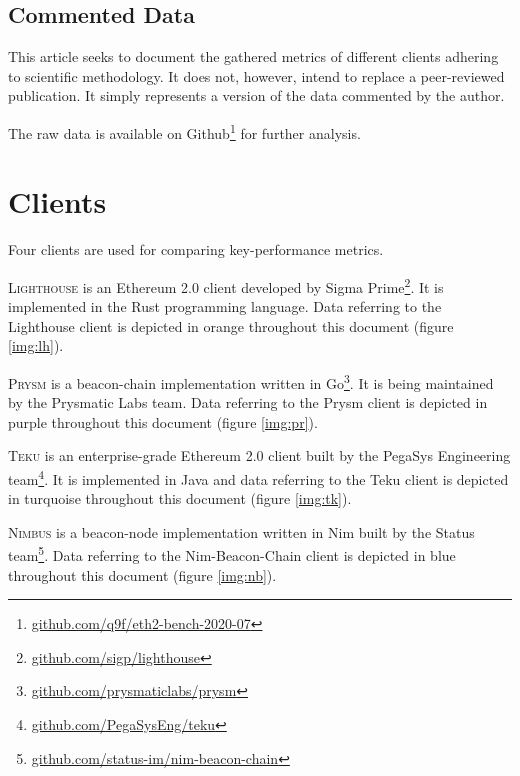 \documentclass[twoside,twocolumn]{article}
\begin{document}
\subsection{Commented Data}
This article seeks to document the gathered metrics of different clients adhering to scientific methodology. It does not, however, intend to replace a peer-reviewed publication. It simply represents a version of the data commented by the author.\par

The raw data is available on Github\footnote{\href{https://github.com/q9f/eth2-bench-2020-07}{github.com/q9f/eth2-bench-2020-07}} for further analysis.

\section{Clients}
\label{sec:cli}

Four clients are used for comparing key-performance metrics.\par

\textsc{Lighthouse} is an Ethereum 2.0 client developed by Sigma Prime\footnote{\href{https://github.com/sigp/lighthouse}{github.com/sigp/lighthouse}}. It is implemented in the Rust programming language. Data referring to the Lighthouse client is depicted in orange throughout this document (figure \ref{img:lh}).\par

\textsc{Prysm} is a beacon-chain implementation written in Go\footnote{\href{https://github.com/prysmaticlabs/prysm}{github.com/prysmaticlabs/prysm}}. It is being maintained by the Prysmatic Labs team. Data referring to the Prysm client is depicted in purple throughout this document (figure \ref{img:pr}).\par

\textsc{Teku} is an enterprise-grade Ethereum 2.0 client built by the PegaSys Engineering team\footnote{\href{https://github.com/PegaSysEng/teku}{github.com/PegaSysEng/teku}}. It is implemented in Java and data referring to the Teku client is depicted in turquoise throughout this document (figure \ref{img:tk}).\par

\textsc{Nimbus} is a beacon-node implementation written in Nim built by the Status team\footnote{\href{https://github.com/status-im/nim-beacon-chain}{github.com/status-im/nim-beacon-chain}}. Data referring to the Nim-Beacon-Chain client is depicted in blue throughout this document (figure \ref{img:nb}).\par
\end{document}
